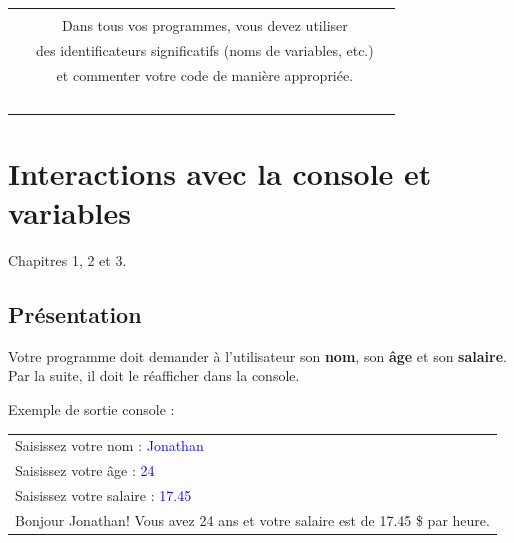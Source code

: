 \documentclass[12pt]{article}
\begin{document}

\begin{center}
\begin{tabular}{c c c}
\hline \\
\quad & Dans tous vos programmes, vous devez utiliser & \quad \\
& des identificateurs significatifs (noms de variables, etc.)\\
& et commenter votre code de manière appropriée.\\
\ \\
\hline
\end{tabular}
\end{center}




%
%

\section{Interactions avec la console et variables}
\vspace*{-\baselineskip}
Chapitres 1, 2 et 3.

%
%
%

\subsection{Présentation}

Votre programme doit demander à l'utilisateur son \textbf{nom}, son \textbf{âge} et son \textbf{salaire}. Par la suite, il doit le réafficher dans la console.

Exemple de sortie console :

{\footnotesize {}\selectfont
\begin{tabular}{|p{}|}
\hline 
Saisissez votre nom : \textcolor{blue}{Jonathan}\\
Saisissez votre âge : \textcolor{blue}{24}\\
Saisissez votre salaire : \textcolor{blue}{17.45}\\[\baselineskip]

Bonjour Jonathan! Vous avez 24 ans et votre salaire est de 17.45 \$ par heure.\\
\hline
\end{tabular}
}
\end{document}
